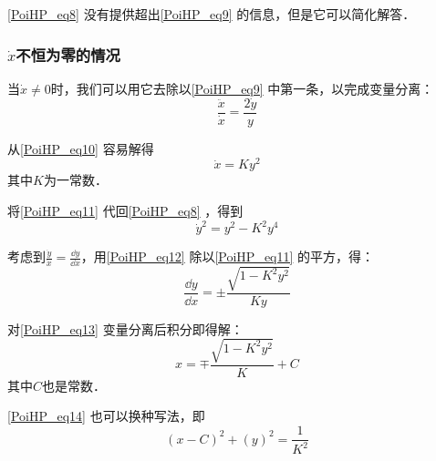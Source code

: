 \autoref{PoiHP_eq8} 没有提供超出\autoref{PoiHP_eq9} 的信息，但是它可以简化解答．

\subsubsection{$\dot{x}$不恒为零的情况}

{}%

当$\dot{x}\ne 0$时，我们可以用它去除以\autoref{PoiHP_eq9} 中第一条，以完成变量分离：
\begin{equation}\label{PoiHP_eq10}
\frac{\ddot{x}}{\dot{x}}=\frac{2\dot{y}}{y}
\end{equation}

从\autoref{PoiHP_eq10} 容易解得
\begin{equation}\label{PoiHP_eq11}
\dot{x}=Ky^2
\end{equation}
其中$K$为一常数．

将\autoref{PoiHP_eq11} 代回\autoref{PoiHP_eq8} ，得到
\begin{equation}\label{PoiHP_eq12}
\dot{y}^2=y^2-K^2y^4
\end{equation}

考虑到$\frac{\dot{y}}{\dot{x}}=\frac{\dd y}{\dd x}$，用\autoref{PoiHP_eq12} 除以\autoref{PoiHP_eq11} 的平方，得：
\begin{equation}\label{PoiHP_eq13}
\frac{\dd y}{\dd x}=\pm\frac{\sqrt{1-K^2y^2}}{Ky}
\end{equation}

对\autoref{PoiHP_eq13} 变量分离后积分即得解：
\begin{equation}\label{PoiHP_eq14}
x=\mp\frac{\sqrt{1-K^2y^2}}{K}+C
\end{equation}
其中$C$也是常数．

\autoref{PoiHP_eq14} 也可以换种写法，即
\begin{equation}
(x-C)^2+(y)^2=\frac{1}{K^2}
\end{equation}











